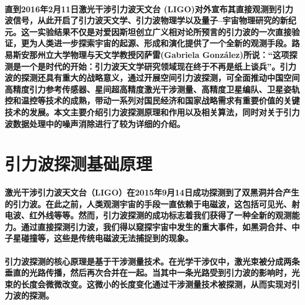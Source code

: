 \documentclass{article}
\begin{document}
\paragraph{直到2016年2月11日激光干涉引力波天文台 (LIGO)对外宣布其直接观测到引力波信号，从此开启了引力波天文学、引力波物理学以及量子–宇宙物理研究的新纪元。这一实验结果不仅是对爱因斯坦创立广义相对论所预言的引力波的一次直接验证，更为人类进一步探索宇宙的起源、形成和演化提供了一个全新的观测手段。路易斯安那州立大学物理与天文学教授冈萨雷(Gabriela González)所说：“这项探测是一个是时代的开始：引力波天文学研究领域现在终于不再是纸上谈兵”。引力波的探测还具有重大的战略意义，通过开展空间引力波探测，可全面推动中国空间高精度引力参考传感器、星间超高精度激光干涉测量、高精度卫星编队、卫星姿轨控和温控等技术的成熟，带动一系列对国民经济和国家战略需求有重要价值的关键技术的发展。\textbf{本文主要介绍引力波探测原理和作用以及相关算法，同时对关于引力波数据处理中的噪声消除进行了较为详细的介绍。}}
\section{引力波探测基础原理}
\paragraph{激光干涉引力波天文台（LIGO）在2015年9月14日成功探测到了双黑洞并合产生的引力波。在此之前，人类观测宇宙的手段一直依赖于电磁波，这包括可见光、射电波、红外线等等。然而，引力波探测的成功标志着我们获得了一种全新的观测能力。通过直接探测引力波，我们得以窥探宇宙中发生的重大事件，如黑洞合并、中子星碰撞等，这些是传统电磁波无法捕捉到的现象。}
\paragraph{引力波探测的核心原理是基于干涉测量技术。在光学干涉仪中，激光束被分成两条垂直的光路传播，然后再次合并在一起。当其中一条光路受到引力波的影响时，光束的长度会微微改变。这微小的长度变化通过干涉测量技术被探测，从而实现对引力波的探测。}
\end{document}
